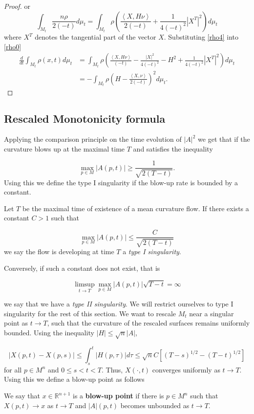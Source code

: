 \begin{proof}
or 
\begin{equation}
\int_{M_{t}}\frac{n\rho}{2(-t)} d \mu_{t} = \int_{M_{t}} \rho \left(  \frac{\left< X,H \nu \right>}{2(-t)} + \frac{1}{4(-t)^2}|X^T|^2 \right)d \mu_{t}\label{rho4}
\end{equation}
where $ X^{T} $ denotes the tangential part of the vector $ X $. Substituting \cref{rho4} into \cref{rho0}
\begin{align*}
\frac{d}{dt} \int_{M_{t}}\rho(x,t)d \mu_{t}  &=  \int_{M_{t}}\rho\left(\frac{\left< X,H \nu\right>}{(-t)}- \frac{|X|^{2}}{4(-t)^{2}} -H^{2}+ \frac{1}{4(-t)^2}|X^T|^2\right)d \mu_{t}\\ 
& = -\int_{M_{t}} \rho \left( H - \frac{\left< X, \nu \right>}{2(-t)} \right)^{2} d \mu_{t}.
\end{align*}
\end{proof}

\subsection{Rescaled Monotonicity formula}\label{Type1singularity}

Applying the comparison principle on the time evolution of $ |A|^{2} $ we get that if the curvature blows up at the maximal time $ T $  and satisfies the inequality

\[ \max_{p \in M}|A(p,t)| \ge \frac{1}{\sqrt{2(T-t)}}.\]
Using this we define the type I singularity if the blow-up rate is bounded by a constant. 
\begin{defn}
Let $ T $ be the maximal time of existence of a mean curvature flow. If there exists a constant $ C >1 $ such that 

\[ \max_{p \in M}|A(p,t)| \le \frac{C}{\sqrt{2(T-t)}} \]
we say the flow is developing at time $ T $ a \textit{type I singularity}.
\end{defn}

Conversely, if such a constant does not exist, that is 

\[ \limsup_{t \to T} \max_{p \in M}|A(p,t)|\sqrt{T-t} = \infty \]

we say that we have a \textit{type II singularity}. We will restrict ourselves to type I singularity for the rest of this section. We want to rescale $M_t$ near a singular point as $t \rightarrow T$, such that the curvature of the rescaled surfaces remains uniformly bounded. Using the inequality $ |H| \le \sqrt{n}|A| $, 

$$
|X(p, t)-X(p, s)| \leq \int_s^t|H(p, \tau)| d \tau \leq \sqrt{n}C\left[(T-s)^{1 / 2}-(T-t)^{1 / 2}\right]
$$
for all $p \in M^n$ and $0 \leq s<t<T$. Thus, $X(\cdot, t)$ converges uniformly as $t \rightarrow T$. Using this we define a blow-up point as follows
\begin{defn}
    We say that $x \in \mathbb{R}^{n+1}$ is a \textbf{blow-up point}  if there is $p \in M^n$ such that $X(p, t) \rightarrow x$ as $t \rightarrow T$ and $|A|(p, t)$ becomes unbounded as $t \rightarrow T$.
\end{defn}

